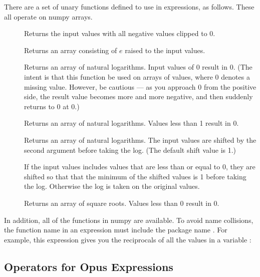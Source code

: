 There are a set of unary functions defined to use in expressions, as
follows.  These all operate on numpy arrays.

\begin{description}

\item[] Returns the input values with all negative values
   clipped to 0. 

\item[] Returns an array consisting of $e$ raised to the input 
values.

\item[] Returns an array of natural logarithms.  Input values of 0
result in 0.  (The intent is that this function be used on arrays of
values, where 0 denotes a missing value.  However, be cautious --- as you
approach 0 from the positive side, the result value becomes more and more
negative, and then suddenly returns to 0 at 0.)  

\item[] Returns an array of natural logarithms. Values
less than 1 result in 0.  

\item[] Returns an array of natural logarithms.  The input
  values are shifted by the second argument before taking the log.  (The
  default shift value is 1.)  

\item[] If the input values includes values that are
less than or equal to 0, they are shifted so that that the minimum of the
shifted values is 1 before taking the log.  Otherwise the log is taken on
the original values.  

\item[] Returns an array of square roots.  Values less than 0
  result in 0. 

\end{description}

In addition, all of the functions in numpy are available.  To avoid name
collisions, the function name in an expression must include the package
name .  For example, this expression gives you the reciprocals
of all the values in a variable :


\subsection{Operators for Opus Expressions}

